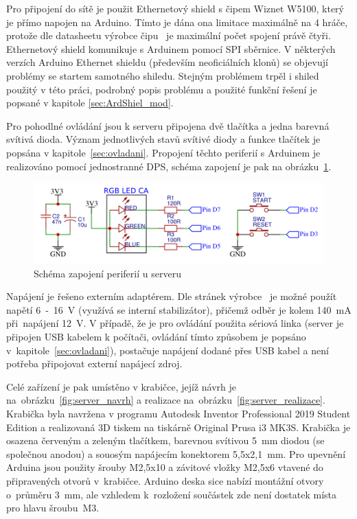 Pro připojení do sítě je použit Ethernetový shield s čipem Wiznet W5100, který je přímo napojen na Arduino. Tímto je dána ona limitace maximálně na 4 hráče, protože dle datasheetu výrobce čipu~\cite{datasheet_w5100} je maximální počet spojení právě čtyři. Ethernetový shield komunikuje s Arduinem pomocí SPI sběrnice. V některých verzích Arduino Ethernet shieldu (především neoficiálních klonů) se objevují problémy se startem samotného shiledu. Stejným problémem trpěl i shiled použitý v této práci, podrobný popis problému a použité funkční řešení je popsané v kapitole \ref{sec:ArdShiel_mod}.

Pro pohodlné ovládání jsou k serveru připojena dvě tlačítka a jedna barevná svítivá dioda. Význam jednotlivých stavů svítivé diody a funkce tlačítek je popsána v kapitole~\ref{sec:ovladani}. Propojení těchto periferií s Arduinem je realizováno pomocí jednostranné DPS, schéma zapojení je pak na obrázku~\ref{fig:server_module}.

\begin{figure}[hbtp]
  \centering
  \includegraphics[width=12cm]{img/server_module.png}
  \caption{\label{fig:server_module} Schéma zapojení periferií u serveru}
\end{figure}

Napájení je řešeno externím adaptérem. Dle stránek výrobce~\cite{ArdDue_web} je možné použít napětí 6~-~16~V (využívá se interní stabilizátor), přičemž odběr je kolem 140~mA při~napájení 12~V. V případě, že je pro ovládání použita sériová linka (server je připojen USB kabelem k počítači, ovládání tímto způsobem je popsáno v~kapitole~\ref{sec:ovladani}), postačuje napájení dodané přes USB kabel a není potřeba připojovat externí napájecí zdroj.

Celé zařízení je pak umístěno v krabičce, jejíž návrh je na~obrázku~\ref{fig:server_navrh} a realizace na~obrázku~\ref{fig:server_realizace}. Krabička byla navržena v programu Autodesk Inventor Professional 2019 Student Edition a realizovaná 3D tiskem na tiskárně Original Prusa i3 MK3S. Krabička je osazena červeným a zeleným tlačítkem, barevnou svítivou 5~mm diodou (se společnou anodou) a souosým napájecím konektorem 5,5x2,1~mm. Pro upevnění Arduina jsou použity šrouby M2,5x10 a závitové vložky M2,5x6 vtavené do připravených otvorů v~krabičce. Arduino deska sice nabízí montážní otvory o~průměru 3~mm, ale vzhledem k~rozložení součástek zde není dostatek místa pro hlavu šroubu~M3.

